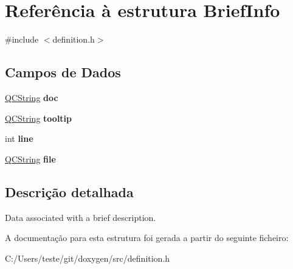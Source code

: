 \hypertarget{struct_brief_info}{\section{Referência à estrutura Brief\-Info}
\label{struct_brief_info}
}


{\ttfamily \#include $<$definition.\-h$>$}

\subsection*{Campos de Dados}
\begin{DoxyCompactItemize}
\item 
\hypertarget{struct_brief_info_a9910424bf5401d657c3b3fdff6fcc152}{\hyperlink{class_q_c_string}{Q\-C\-String} {\bfseries doc}}\label{struct_brief_info_a9910424bf5401d657c3b3fdff6fcc152}

\item 
\hypertarget{struct_brief_info_a2318b22a7da2a58c0bd61e3b40b7ea9c}{\hyperlink{class_q_c_string}{Q\-C\-String} {\bfseries tooltip}}\label{struct_brief_info_a2318b22a7da2a58c0bd61e3b40b7ea9c}

\item 
\hypertarget{struct_brief_info_a41ebd28ef1d7c6ade45642cb6acc1039}{int {\bfseries line}}\label{struct_brief_info_a41ebd28ef1d7c6ade45642cb6acc1039}

\item 
\hypertarget{struct_brief_info_afeb3e9dc965e44d291bbce99ea8dbcc7}{\hyperlink{class_q_c_string}{Q\-C\-String} {\bfseries file}}\label{struct_brief_info_afeb3e9dc965e44d291bbce99ea8dbcc7}

\end{DoxyCompactItemize}


\subsection{Descrição detalhada}
Data associated with a brief description. 

A documentação para esta estrutura foi gerada a partir do seguinte ficheiro\-:\begin{DoxyCompactItemize}
\item 
C\-:/\-Users/teste/git/doxygen/src/definition.\-h\end{DoxyCompactItemize}
